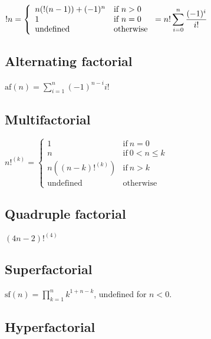 \( \displaystyle{
    !n = \left \lbrace \begin{array}{ll}
      n(!(n - 1)) + (-1)^n & \textrm{if}~ n > 0 \\
      1 & \textrm{if}~ n = 0 \\
      \textrm{undefined} & \textrm{otherwise}
    \end{array} \right . =
    n! \sum_{i = 0}^n {(-1)^i \over i!}
}\)


\subsection{Alternating factorial}
\label{sec:Alternating factorial}

\( \displaystyle{
    \mbox{af}(n) = \sum_{i = 1}^n {(-1)^{n - i} i!}
}\)


\subsection{Multifactorial}
\label{sec:Multifactorial}

\( \displaystyle{
    n!^{(k)} = \left \lbrace \begin{array}{ll}
      1 & \textrm{if}~ n = 0 \\
      n & \textrm{if}~ 0 < n \le k \\
      n((n - k)!^{(k)}) & \textrm{if}~ n > k \\
      \textrm{undefined} & \textrm{otherwise}
    \end{array} \right .
}\)


\subsection{Quadruple factorial}
\label{sec:Quadruple factorial}

\( \displaystyle{
    (4n - 2)!^{(4)}
}\)


\subsection{Superfactorial}
\label{sec:Superfactorial}

\( \displaystyle{
    \mbox{sf}(n) = \prod_{k = 1}^n k^{1 + n - k}
}\), undefined for $n < 0$.


\subsection{Hyperfactorial}
\label{sec:Hyperfactorial}

